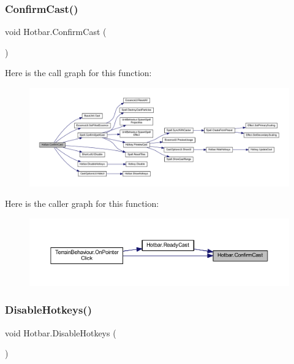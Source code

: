\subsubsection{\texorpdfstring{ConfirmCast()}{ConfirmCast()}}
{\footnotesize\ttfamily void Hotbar.\+Confirm\+Cast (\begin{DoxyParamCaption}{ }\end{DoxyParamCaption})}

Here is the call graph for this function\+:
\nopagebreak
\begin{figure}[H]
\begin{center}
\leavevmode
\includegraphics[width=350pt]{class_hotbar_a535ef71789d10c417b86bdd194e3e5b7_cgraph}
\end{center}
\end{figure}
Here is the caller graph for this function\+:
\nopagebreak
\begin{figure}[H]
\begin{center}
\leavevmode
\includegraphics[width=350pt]{class_hotbar_a535ef71789d10c417b86bdd194e3e5b7_icgraph}
\end{center}
\end{figure}
\mbox{\label{class_hotbar_a914ca0c61c4d64b0bde6e829064f71a9}} 
\subsubsection{\texorpdfstring{DisableHotkeys()}{DisableHotkeys()}}
{\footnotesize\ttfamily void Hotbar.\+Disable\+Hotkeys (\begin{DoxyParamCaption}{ }\end{DoxyParamCaption})}

